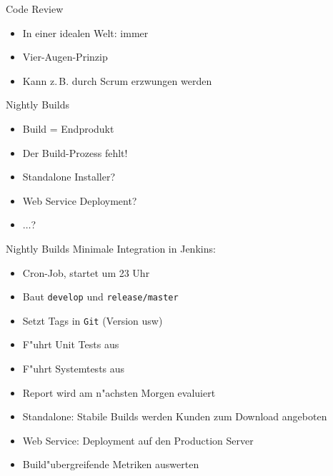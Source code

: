 \documentclass{beamer}
\begin{document}
\begin{frame}{Code Review}
	\begin{itemize}
		\item In einer idealen Welt: immer
		\item Vier-Augen-Prinzip
		\item Kann z.\,B. durch Scrum erzwungen werden
	\end{itemize}
\end{frame}

\begin{frame}{Nightly Builds}
	\begin{itemize}
		\item Build = Endprodukt
		\item Der Build-Prozess fehlt!
		\item Standalone Installer?
		\item Web Service Deployment?
		\item $\ldots$?
	\end{itemize}
\end{frame}

\begin{frame}{Nightly Builds}
	Minimale Integration in Jenkins:
	\begin{itemize}
		\item Cron-Job, startet um 23 Uhr
		\item Baut \texttt{develop} und \texttt{release/master}
		\item Setzt Tags in \texttt{Git} (Version usw)
		\item F"uhrt Unit Tests aus
		\item F"uhrt Systemtests aus
		\item Report wird am n"achsten Morgen evaluiert
		\item Standalone: Stabile Builds werden Kunden zum Download angeboten
		\item Web Service: Deployment auf den Production Server
		\item Build"ubergreifende Metriken auswerten
	\end{itemize}
\end{frame}
\end{document}
